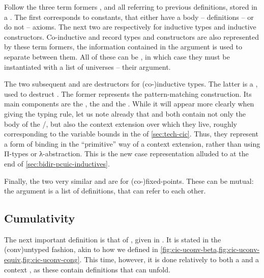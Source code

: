 Follow the three term formers ,  and
 all referring to previous definitions, stored in a .
The first corresponds to constants, that either have a body – definitions –
or do not – axioms. The next two are respectively for
inductive types and inductive constructors. Co-inductive and record types and
constructors are also represented by these term formers, the information contained in the
 argument is used to separate between them.
All of these can be , in which case they must be instantiated
with a list of universes – their  argument.

The two subsequent  and  are destructors for (co-)inductive types. The
latter is a , used to destruct . The former represents the
pattern-matching construction. Its main components are the  , the
  and the  . While it will appear more clearly
when giving the typing rule, let us note already that  and  both contain not
only the body of the /, but also the context extension over which
they live, roughly corresponding to the variable bounds in the  of \cref{sec:tech-cic}.
Thus, they represent a form of binding in the “primitive” way of a context extension, rather
than using Π-types or λ-abstraction. This is the new case representation alluded to
at the end of \cref{sec:bidir-pcuic-inductives}.

Finally, the two very similar  and  are for (co-)fixed-points. 
These can be mutual: the  argument is a list of definitions,
that can refer to each other.

\subsection{Cumulativity}

The next important definition is that of , given in .%
It is stated in the  \kl(conv){untyped} fashion,
akin to how we defined  in
\cref{fig:cic-uconv-beta,fig:cic-uconv-equiv,fig:cic-uconv-cong}.
This time, however, it is done relatively to
both a   and a context ,
as these contain definitions that  can unfold.

